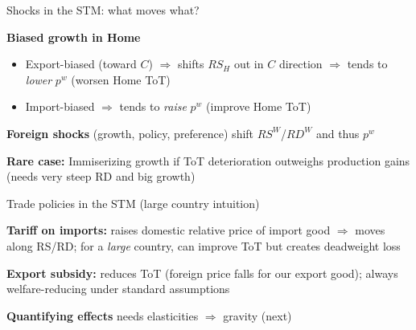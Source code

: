 \documentclass[notes,11pt, aspectratio=169, xcolor=table]{beamer}
\newenvironment{wideitemize}{\itemize\addtolength{\itemsep}{10pt}}{\enditemize}
\begin{document}
\begin{frame}{Shocks in the STM: what moves what?}
\begin{wideitemize}
  \item \textbf{Biased growth in Home}
    \begin{itemize}
      \item Export-biased (toward $C$) $\Rightarrow$ shifts $RS_H$ out in $C$ direction $\Rightarrow$ tends to \emph{lower} $p^w$ (worsen Home ToT)
      \item Import-biased $\Rightarrow$ tends to \emph{raise} $p^w$ (improve Home ToT)
    \end{itemize}
  \item \textbf{Foreign shocks} (growth, policy, preference) shift $RS^W$/$RD^W$ and thus $p^w$
  \item \textbf{Rare case:} Immiserizing growth if ToT deterioration outweighs production gains (needs very steep RD and big growth)
\end{wideitemize}
\end{frame}

\begin{frame}{Trade policies in the STM (large country intuition)}
\begin{wideitemize}
  \item \textbf{Tariff on imports:} raises domestic relative price of import good $\Rightarrow$ moves along RS/RD; for a \emph{large} country, can improve ToT but creates deadweight loss
  \item \textbf{Export subsidy:} reduces ToT (foreign price falls for our export good); always welfare-reducing under standard assumptions
  \item \textbf{Quantifying effects} needs elasticities $\Rightarrow$ gravity (next)
\end{wideitemize}
\end{frame}

\end{document}
